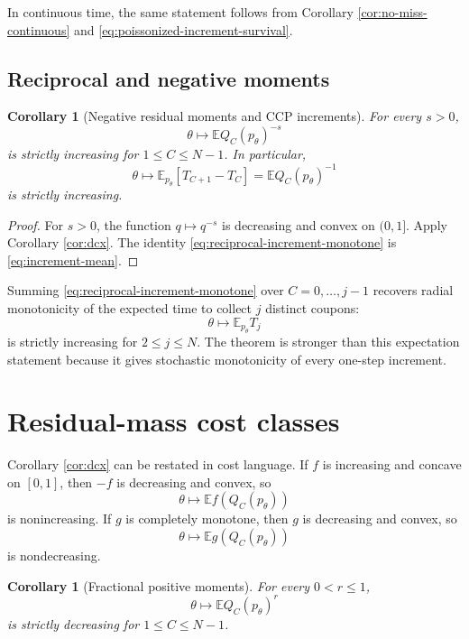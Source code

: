 \documentclass[11pt]{article}
\newtheorem{corollary}[theorem]{Corollary}
\newcommand{\E}{\mathbb E}
\newcommand{\1}{\mathbf 1}
\begin{document}
In continuous time, the same statement follows from Corollary \ref{cor:no-miss-continuous}
and \eqref{eq:poissonized-increment-survival}.

\subsection{Reciprocal and negative moments}

\begin{corollary}[Negative residual moments and CCP increments]\label{cor:negative-moments}
For every $s>0$,
\[
        \theta\mapsto \E Q_C(p_\theta)^{-s}
\]
is strictly increasing for $1\le C\le N-1$.  In particular,
\begin{equation}\label{eq:reciprocal-increment-monotone}
        \theta\mapsto \E_{p_\theta}[T_{C+1}-T_C]
        =\E Q_C(p_\theta)^{-1}
\end{equation}
is strictly increasing.
\end{corollary}

\begin{proof}
For $s>0$, the function $q\mapsto q^{-s}$ is decreasing and convex on $(0,1]$.  Apply
Corollary \ref{cor:dcx}.  The identity \eqref{eq:reciprocal-increment-monotone} is
\eqref{eq:increment-mean}.
\end{proof}

Summing \eqref{eq:reciprocal-increment-monotone} over $C=0,\ldots,j-1$ recovers radial
monotonicity of the expected time to collect $j$ distinct coupons:
\[
        \theta\mapsto \E_{p_\theta}T_j
\]
is strictly increasing for $2\le j\le N$.  The theorem is stronger than this expectation
statement because it gives stochastic monotonicity of every one-step increment.

\section{Residual-mass cost classes}

Corollary \ref{cor:dcx} can be restated in cost language.  If $f$ is increasing and
concave on $[0,1]$, then $-f$ is decreasing and convex, so
\[
        \theta\mapsto \E f(Q_C(p_\theta))
\]
is nonincreasing.  If $g$ is completely monotone, then $g$ is decreasing and convex, so
\[
        \theta\mapsto \E g(Q_C(p_\theta))
\]
is nondecreasing.

\begin{corollary}[Fractional positive moments]\label{cor:fractional-positive}
For every $0<r\le1$,
\[
        \theta\mapsto \E Q_C(p_\theta)^r
\]
is strictly decreasing for $1\le C\le N-1$.
\end{corollary}
\end{document}
